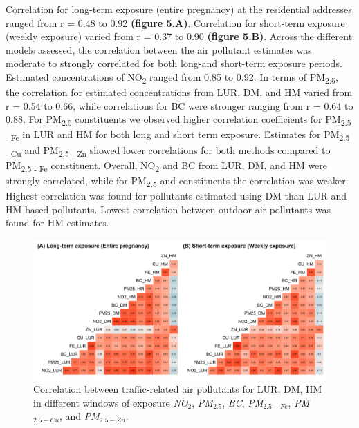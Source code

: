 \documentclass{article}
\begin{document}
Correlation for long-term exposure (entire pregnancy) at the residential addresses ranged from r = 0.48 to 0.92 \textbf{(figure 5.A)}. Correlation for short-term exposure (weekly exposure) varied from r = 0.37 to 0.90 \textbf{(figure 5.B)}. Across the different models assessed, the correlation between the air pollutant estimates was moderate to strongly correlated for both long-and short-term exposure periods. Estimated concentrations of NO\textsubscript{2} ranged from 0.85 to 0.92. In terms of PM\textsubscript{2.5}, the correlation for estimated concentrations from LUR, DM, and HM varied from r = 0.54 to 0.66, while correlations for BC were stronger ranging from r = 0.64 to 0.88. For PM\textsubscript{2.5} constituents we observed higher correlation coefficients for PM\textsubscript{2.5 - Fe} in LUR and HM for both long and short term exposure. Estimates for PM\textsubscript{2.5 - Cu} and PM\textsubscript{2.5 - Zn} showed lower correlations for both methods compared to PM\textsubscript{2.5 - Fe} constituent. Overall, NO\textsubscript{2} and BC from LUR, DM, and HM were strongly correlated, while for PM\textsubscript{2.5} and constituents the correlation was weaker. Highest correlation was found for pollutants estimated using DM than LUR and HM based pollutants. Lowest correlation between outdoor air pollutants was found for HM estimates. 

\captionsetup[figure]{skip=6pt}
\begin{figure}[!h]
\includegraphics[width=1.0\textwidth]{figures/correlation_fig_v2.png}
\caption{Correlation between traffic-related air pollutants for LUR, DM, HM in different windows of exposure \textit{NO$_2$}, \textit{PM$_{2.5}$}, \textit{BC}, \textit{PM$_{2.5 - Fe}$}, \textit{PM$_{2.5 - Cu}$}, and \textit{PM$_{2.5 - Zn}$}.}
\label{fig5}
\end{figure}
\end{document}
